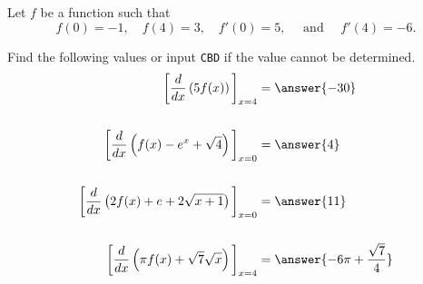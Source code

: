 \documentclass{ximera}
\author{Nela Lakos \and Kyle Parsons}
\begin{document}
\begin{exercise}

Let $f$ be a function such that
\[
f(0) = -1,\quad f(4) = 3,\quad f'(0) = 5, \quad \text{ and } \quad f'(4) = -6.
\]

Find the following values or input \verb|CBD| if the value cannot be determined.
\begin{align*}
	\eval{\ddx\left(5f(x)\right)}_{x=4} &= \answer{-30}\\
	\\
	\eval{\ddx\left(f(x) - e^x + \sqrt{4}\right)}_{x=0} &= \answer{4}\\
	\\
	\eval{\ddx\left(2f(x) + e + 2\sqrt{x+1}\right)}_{x=0} &= \answer{11}\\
	\\
	\eval{\ddx\left(\pi f(x) + \sqrt{7}\sqrt{x}\right)}_{x=4} &= \answer{-6\pi + \frac{\sqrt{7}}{4}}
\end{align*}

\end{exercise}
\end{document}
